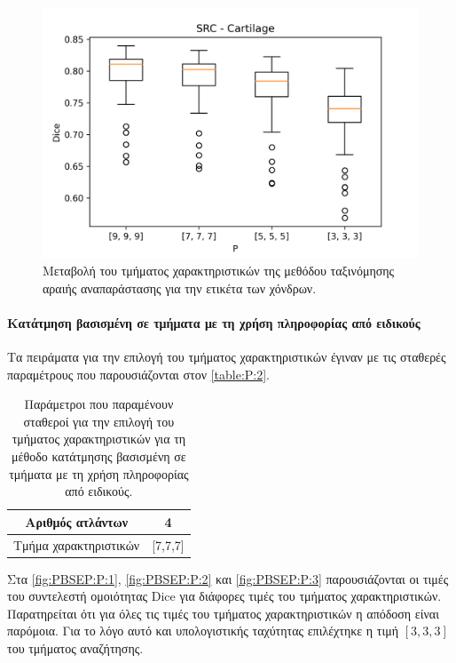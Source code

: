 \documentclass[a4paper,12pt]{article}
\newcommand{\paragraphLine}[1]{\paragraph{#1}\mbox{}}
\begin{document}
\begin{figure}[H]
    \centering
    \includegraphics[width=0.85\linewidth]{SRC_P_Cartilage_plot.png}
    \caption{Μεταβολή του τμήματος χαρακτηριστικών της μεθόδου ταξινόμησης
             αραιής αναπαράστασης για την ετικέτα των χόνδρων.}
    \label{fig:SRC:P:3}
\end{figure}

\paragraphLine{Κατάτμηση βασισμένη σε τμήματα με τη χρήση πληροφορίας από
               ειδικούς}

Τα πειράματα για την επιλογή του τμήματος χαρακτηριστικών έγιναν με τις σταθερές
παραμέτρους που παρουσιάζονται στον \autoref{table:P:2}.

\begin{table}[h!]
    \centering
    \begin{tabular}{|c|c|} 
        \hline
        Αριθμός ατλάντων & 4 \\ 
        \hline
        Τμήμα χαρακτηριστικών & [7,7,7] \\ 
        \hline
    \end{tabular}
    \caption{Παράμετροι που παραμένουν σταθεροί για την επιλογή του τμήματος
             χαρακτηριστικών για τη μέθοδο κατάτμησης βασισμένη σε τμήματα με τη
             χρήση πληροφορίας από ειδικούς.}
    \label{table:P:2}
\end{table}

Στα \autoref{fig:PBSEP:P:1}, \autoref{fig:PBSEP:P:2} και \autoref{fig:PBSEP:P:3}
παρουσιάζονται οι τιμές του συντελεστή ομοιότητας Dice για διάφορες τιμές του
τμήματος χαρακτηριστικών. Παρατηρείται ότι για όλες τις τιμές του τμήματος
χαρακτηριστικών η απόδοση είναι παρόμοια. Για το λόγο αυτό και υπολογιστικής
ταχύτητας επιλέχτηκε η τιμή $[3,3,3]$ του τμήματος αναζήτησης.
\end{document}

